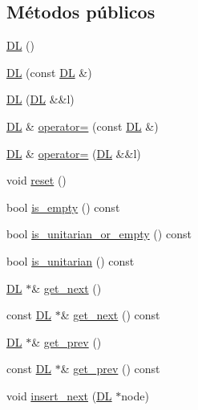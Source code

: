 \subsection*{Métodos públicos}
\begin{DoxyCompactItemize}
\item 
\hyperlink{class_designar_1_1_d_l_a1e17a6036b4e5325d5aeb6641074ee14}{DL} ()
\item 
\hyperlink{class_designar_1_1_d_l_a4caafdd81bc08bdb7d42cbcbe735f59f}{DL} (const \hyperlink{class_designar_1_1_d_l}{DL} \&)
\item 
\hyperlink{class_designar_1_1_d_l_a4a9a38fbd77259a4af54dcd5017fce76}{DL} (\hyperlink{class_designar_1_1_d_l}{DL} \&\&l)
\item 
\hyperlink{class_designar_1_1_d_l}{DL} \& \hyperlink{class_designar_1_1_d_l_a7eb7d13fee4174fa5f4166722316530d}{operator=} (const \hyperlink{class_designar_1_1_d_l}{DL} \&)
\item 
\hyperlink{class_designar_1_1_d_l}{DL} \& \hyperlink{class_designar_1_1_d_l_adc892f364736bab874a6a739e88b5c60}{operator=} (\hyperlink{class_designar_1_1_d_l}{DL} \&\&l)
\item 
void \hyperlink{class_designar_1_1_d_l_a859e63ccad5bfe211d1fd7396f871091}{reset} ()
\item 
bool \hyperlink{class_designar_1_1_d_l_a01d421aa787edb4087c1b2c266554ca5}{is\+\_\+empty} () const
\item 
bool \hyperlink{class_designar_1_1_d_l_aae41f00b718a0fe8bed1be458b2dffac}{is\+\_\+unitarian\+\_\+or\+\_\+empty} () const
\item 
bool \hyperlink{class_designar_1_1_d_l_a262dfc0edc2656658f89b39ee272fac6}{is\+\_\+unitarian} () const
\item 
\hyperlink{class_designar_1_1_d_l}{DL} $\ast$\& \hyperlink{class_designar_1_1_d_l_a9ba5385743ae2c266ea51dcb05f79803}{get\+\_\+next} ()
\item 
const \hyperlink{class_designar_1_1_d_l}{DL} $\ast$\& \hyperlink{class_designar_1_1_d_l_ad95ed8f7db042ad4f537b335e8b77772}{get\+\_\+next} () const
\item 
\hyperlink{class_designar_1_1_d_l}{DL} $\ast$\& \hyperlink{class_designar_1_1_d_l_a479355d41d2d7085b33342a14c0ca514}{get\+\_\+prev} ()
\item 
const \hyperlink{class_designar_1_1_d_l}{DL} $\ast$\& \hyperlink{class_designar_1_1_d_l_a2f7ae6156dd09a783b6d1fc726af47c0}{get\+\_\+prev} () const
\item 
void \hyperlink{class_designar_1_1_d_l_a668fa2d4441cdbdba8640fbdab1b220c}{insert\+\_\+next} (\hyperlink{class_designar_1_1_d_l}{DL} $\ast$node)

\end{DoxyCompactItemize}
